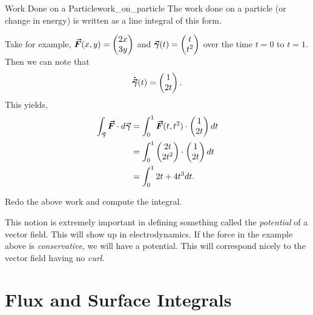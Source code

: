         \begin{ex}{Work Done on a Particle}{work_on_particle}
        The work done on a particle (or change in energy) is written as a line integral of this form.  
        
        Take for example, $\boldsymbol{\vec{F}}(x,y)=\begin{pmatrix} 2x \\ 3y \end{pmatrix}$ and $\boldsymbol{\vec{\gamma}}(t)=\begin{pmatrix} t \\ t^2 \end{pmatrix}$ over the time $t=0$ to $t=1$.  Then we can note that 
        \[
            \boldsymbol{\dot{\vec{\gamma}}}(t) = \begin{pmatrix} 1 \\ 2t \end{pmatrix}.
        \]
        This yields,
        \begin{align*}
        \int_{\boldsymbol{\vec{\gamma}}} \boldsymbol{\vec{F}} \cdot d\boldsymbol{\vec{\gamma}} &= \int_0^1 \boldsymbol{\vec{F}}(t,t^2)\cdot \begin{pmatrix} 1 \\ 2t \end{pmatrix} dt\\
        &= \int_0^1 \begin{pmatrix} 2t \\ 2t^2 \end{pmatrix} \cdot \begin{pmatrix} 1 \\ 2t \end{pmatrix}dt\\
        &=\int_0^1 2t+4t^3dt.
        \end{align*}
        \end{ex}
        
        \begin{exercise}
        	Redo the above work and compute the integral.
        \end{exercise}
        
        \begin{remark}
        This notion is extremely important in defining something called the \emph{potential} of a vector field.  This will show up in electrodynamics. If the force in the example above is \emph{conservative}, we will have a potential.  This will correspond nicely to the vector field having no \emph{curl}.
        \end{remark}

         \section{Flux and Surface Integrals}
         
